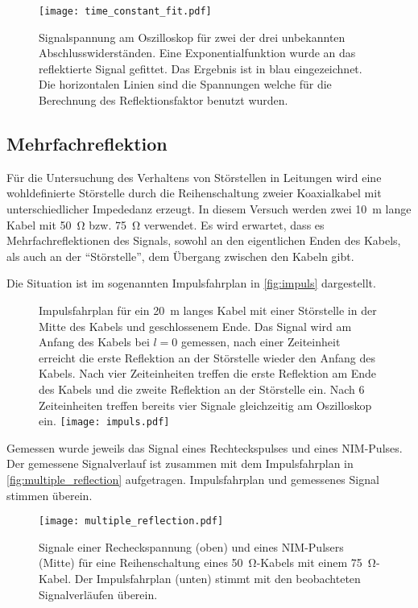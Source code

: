 \begin{figure}
  \centering
  \texttt{[image: time\_constant\_fit.pdf]}
  \caption{%
    Signalspannung am Oszilloskop für zwei der drei unbekannten Abschlusswiderständen. Eine Exponentialfunktion wurde an das reflektierte Signal
    gefittet. Das Ergebnis ist in blau eingezeichnet. Die horizontalen Linien sind die Spannungen welche für die Berechnung des Reflektionsfaktor
    benutzt wurden.
  }\label{fig:fit}
\end{figure}
\subsection{Mehrfachreflektion}

Für die Untersuchung des Verhaltens von Störstellen in Leitungen wird eine wohldefinierte
Störstelle durch die Reihenschaltung zweier Koaxialkabel mit unterschiedlicher Impededanz
erzeugt.
In diesem Versuch werden zwei \SI{10}{\meter} lange Kabel mit \SI{50}{\ohm} bzw. \SI{75}{\ohm} verwendet.
Es wird erwartet, dass es Mehrfachreflektionen des Signals, sowohl an den eigentlichen Enden
des Kabels, als auch an der \enquote{Störstelle}, dem Übergang zwischen den Kabeln gibt.

Die Situation ist im sogenannten Impulsfahrplan in \autoref{fig:impuls} dargestellt.

\begin{figure}
  \captionsetup{format=plain}
  \begin{captionbeside}{%
      Impulsfahrplan für ein \SI{20}{\meter} langes Kabel mit einer Störstelle in
      der Mitte des Kabels und geschlossenem Ende.
      Das Signal wird am  Anfang des Kabels bei $l = 0$ gemessen, nach einer Zeiteinheit
      erreicht die erste Reflektion an der Störstelle wieder den Anfang des Kabels.
      Nach vier Zeiteinheiten treffen die erste Reflektion am Ende des Kabels und die
      zweite Reflektion an der Störstelle ein. Nach 6 Zeiteinheiten treffen bereits vier
      Signale gleichzeitig am Oszilloskop ein.
    }%
    \texttt{[image: impuls.pdf]}
  \end{captionbeside}\label{fig:impuls}
\end{figure}

Gemessen wurde jeweils das Signal eines Rechteckspulses und eines NIM-Pulses.
Der gemessene Signalverlauf ist zusammen mit dem Impulsfahrplan in \autoref{fig:multiple_reflection} aufgetragen.
Impulsfahrplan und gemessenes Signal stimmen überein.

\begin{figure}
  \centering
  \texttt{[image: multiple\_reflection.pdf]}
  \caption{%
    Signale einer Recheckspannung (oben) und eines NIM-Pulsers (Mitte) für eine Reihenschaltung eines \SI{50}{\ohm}-Kabels mit einem \SI{75}{\ohm}-Kabel.
    Der Impulsfahrplan (unten) stimmt mit den beobachteten Signalverläufen überein.
  }\label{fig:multiple_reflection}
\end{figure}
